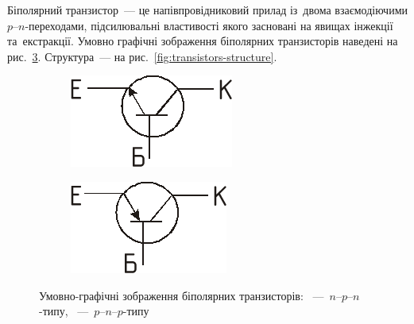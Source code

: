 \documentclass[14pt,ukrainian,utf8,simple]{eskdtext}
\begin{document}
		Біполярний транзистор~— це напівпровідниковий прилад із~двома взаємодіючими $p$–$n$-переходами, підсилювальні властивості якого засновані на явищах інжекції та~екстракції. Умовно графічні зображення біполярних транзисторів наведені на рис.~\ref{fig:transistor-signs}. Структура~— на рис.~\ref{fig:transistors-structure}.
		
		\begin{figure}[!htbp]
		\centering
			\begin{subfigure}[t]{0.5\textwidth - 0.5em}
			\centering
				\includegraphics[height = 2.5\baselineskip]{assets/npn-transistor-sign.png}
			\caption{}
			\label{subfig:npn-transistor}
			\end{subfigure}%
			\quad
			\begin{subfigure}[t]{0.5\textwidth - 0.5em}
			\centering
				\includegraphics[height = 2.5\baselineskip]{assets/pnp-transistor-sign.png}
			\caption{}
			\label{subfig:pnp-transistor}
			\end{subfigure}
		\caption{Умовно-графічні зображення біполярних транзисторів: ~—~\mbox{$n$–$p$–$n$}-типу, ~—~\mbox{$p$–$n$–$p$}-типу}
		\label{fig:transistor-signs}
		\end{figure}
		
\end{document}
